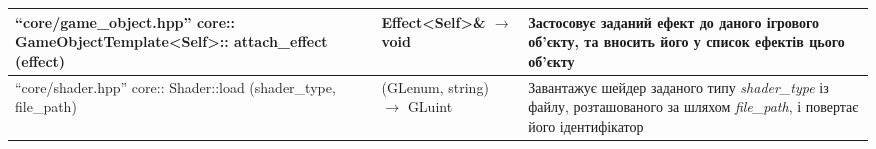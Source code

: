 {\begin{tabular}{| C{6cm} | C{4cm} | C{5cm} |}
    ``core/game_object.hpp'' \newline core:: \newline
    GameObjectTemplate<Self>:: \newline attach_effect \newline (effect)
    & Effect<Self>\& $\to$ void
    & Застосовує заданий ефект до даного ігрового об'єкту, та вносить його у список ефектів цього об'єкту \\
    \hline
    ``core/shader.hpp'' \newline core:: \newline
    Shader::load \newline (shader_type, file_path)
    & (GLenum, string) $\to$ GLuint
    & Завантажує шейдер заданого типу \emph{shader_type} із файлу, розташованого за шляхом \emph{file_path}, і повертає його ідентифікатор \\
    \hline
  \end{tabular}
}